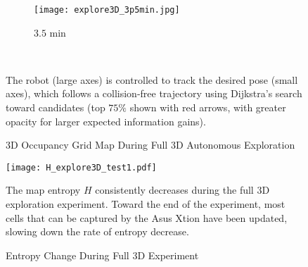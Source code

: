 \begin{figure}[!t]
{	\hspace*{0.02\columnwidth}
	\begin{subfigure}[t]{0.3\columnwidth}
           	\centering
          	\texttt{[image: explore3D\_3p5min.jpg]}
        		\caption{$3.5$ min}
    	\end{subfigure}
}
\\
	\caption{3D Occupancy Grid Map During Full 3D Autonomous Exploration}
	\medskip
	\small
	The robot (large axes) is controlled to track the desired pose (small axes), which follows a collision-free trajectory using Dijkstra's search toward candidates (top $75\%$ shown with red arrows, with greater opacity for larger expected information gains).
	\label{fig:exp3DOccMap}
\end{figure}

\begin{figure}
	\centering
	\texttt{[image: H\_explore3D\_test1.pdf]}
	\caption{Entropy Change During Full 3D Experiment}
	\medskip
	\small
	The map entropy $H$ consistently decreases during the full 3D exploration experiment. Toward the end of the experiment, most cells that can be captured by the Asus Xtion have been updated, slowing down the rate of entropy decrease.
	\label{fig:Explore3D_H}
\end{figure}



